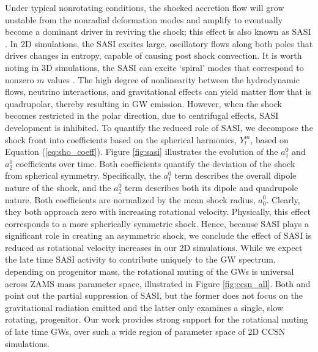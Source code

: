 \documentclass[twocolumn,times]{aastex62}  %
\begin{document}
Under typical nonrotating conditions, the shocked accretion flow will grow unstable from the nonradial deformation modes and amplify to eventually become a dominant driver in reviving the shock; this effect is also known as SASI \citep{scheck:2008,marek:2009a}.  In 2D simulations, the SASI excites large, oscillatory flows along both poles that drives changes in entropy, capable of causing post shock convection.  It is worth noting in 3D simulations, the SASI can excite `spiral' modes that correspond to nonzero $m$ values \citep{blondin:2007,kuroda:2016}.  The high degree of nonlinearity between the hydrodynamic flows, neutrino interactions, and gravitational effects can yield matter flow that is quadrupolar, thereby resulting in GW emission.  However, when the shock becomes restricted in the polar direction, due to centrifugal effects, SASI development is inhibited.  To quantify the reduced role of SASI, we decompose the shock front into coefficients based on the spherical harmonics, $Y_l^m$, based on Equation (\ref{eq:sho_coeff}). Figure \ref{fig:sasi} illustrates the evolution of the $a_1^0$ and $a_2^0$ coefficients over time.  Both coefficients quantify the deviation of the shock from spherical symmetry.  Specifically, the $a_1^0$ term describes the overall dipole nature of the shock, and the $a_2^0$ term describes both its dipole and quadrupole nature.  Both coefficients are normalized by the mean shock radius, $a^0_0$.  Clearly, they both approach zero with increasing rotational velocity.  Physically, this effect corresponds to a more spherically symmetric shock.  Hence, because SASI plays a significant role in creating an asymmetric shock, we conclude the effect of SASI is reduced as rotational velocity increases in our 2D simulations.
While we expect the late time SASI activity to contribute uniquely to the GW spectrum, depending on progenitor mass, the rotational muting of the GWs is universal across ZAMS mass parameter space, illustrated in Figure \ref{fig:ccsn_all}. 
Both \citet{burrows:2007}  and \citet{moro:2018} point out the partial suppression of SASI, but the former does not focus on the gravitational radiation emitted and the latter only examines a single, slow rotating, progenitor.  Our work provides strong support for the rotational muting of late time GWs, over such a wide region of parameter space of 2D CCSN simulations. 
 
\end{document}
